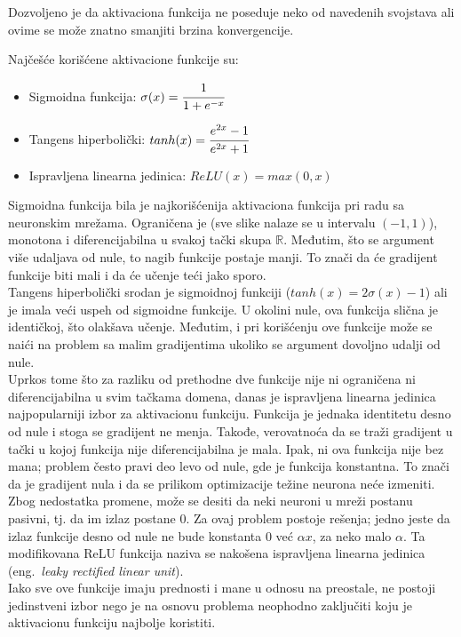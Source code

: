 Dozvoljeno je da aktivaciona funkcija ne poseduje neko od navedenih svojstava ali ovime se može znatno smanjiti brzina konvergencije. 
\par
Najčešće korišćene aktivacione funkcije su:
\begin{itemize}
	\item Sigmoidna funkcija: $\sigma (x) = \cfrac{1}{1+e^{-x}}$
	\item Tangens hiperbolički: $tanh(x) = \cfrac{e^{2x}-1}{e^{2x}+1}$
	\item Ispravljena linearna jedinica: $ReLU(x) = max(0, x)$
\end{itemize}

Sigmoidna funkcija bila je najkorišćenija aktivaciona funkcija pri radu sa neuronskim mrežama. Ograničena je (sve slike nalaze se u intervalu $(-1, 1)$), monotona i diferencijabilna u svakoj tački skupa $\mathbb{R}$. Međutim, što se argument više udaljava od nule, to nagib funkcije postaje manji. To znači da će gradijent funkcije biti mali i da će učenje teći jako sporo. \\
Tangens hiperbolički srodan je sigmoidnoj funkciji ($tanh(x) = 2\sigma (x) - 1$) ali je imala veći uspeh od sigmoidne funkcije.  U okolini nule, ova funkcija slična je identičkoj, što olakšava učenje. Međutim, i pri korišćenju ove funkcije može se naići na problem sa malim gradijentima ukoliko se argument dovoljno udalji od nule.\\
Uprkos tome što za razliku od prethodne dve funkcije nije ni ograničena ni diferencijabilna u svim tačkama domena, danas je ispravljena linearna jedinica najpopularniji izbor za aktivacionu funkciju. Funkcija je jednaka identitetu desno od nule i stoga se gradijent ne menja. Takođe, verovatnoća da se traži gradijent u tački u kojoj funkcija nije diferencijabilna je mala. Ipak, ni ova funkcija nije bez mana; problem često pravi deo levo od nule, gde je funkcija konstantna. To znači da je gradijent nula i da se prilikom optimizacije težine neurona neće izmeniti. Zbog nedostatka promene, može se desiti da neki neuroni u mreži postanu pasivni, tj. da im izlaz postane $0$. Za ovaj problem postoje rešenja; jedno jeste da izlaz funkcije desno od nule ne bude konstanta $0$ već $\alpha x$, za neko malo $\alpha$. Ta modifikovana ReLU funkcija naziva se nakošena ispravljena linearna jedinica (eng.~{\em leaky rectified linear unit}). 
\\
Iako sve ove funkcije imaju prednosti i mane u odnosu na preostale, ne postoji jedinstveni izbor nego je na osnovu problema neophodno zaključiti koju je aktivacionu funkciju najbolje koristiti.

